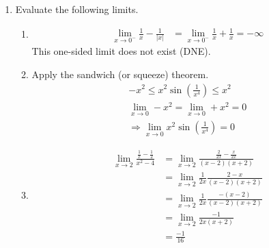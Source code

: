 \begin{enumerate}
    \item Evaluate the following limits.
    \begin{enumerate}
    	\item \begin{align*} 
        \lim_{x \rightarrow 0^-} \frac 1 x - \frac{1}{|x|} 
        &= \lim_{x \rightarrow 0^-} \frac 1 x + \frac{1}{x} = -\infty
        \end{align*}
        This one-sided limit does not exist (DNE). 
    	\item Apply the sandwich (or squeeze) theorem. 
        \begin{align*} 
        	-x^2 \le x^2\sin\left(\frac{1}{x^4}\right) \le x^2\\
        	\lim_{x \rightarrow 0} -x^2 = \lim_{x \rightarrow 0} +x^2 = 0 \\
        	\Rightarrow \lim_{x \rightarrow 0} x^2\sin\left(\frac{1}{x^4}\right) = 0
        \end{align*}
    	\item 
        \begin{align*} 
         	\lim_{x \rightarrow 2} \frac{\frac 1 x - \frac 1 2}{x^2 - 4} 
            & =\lim_{x \rightarrow 2} \frac{\frac {2}{2x} - \frac {x}{2x}}{(x-2)(x+2)} \\
            & =\lim_{x \rightarrow 2} \frac {1}{2x} \frac{2 - x}{(x-2)(x+2)} \\
            & =\lim_{x \rightarrow 2} \frac {1}{2x} \frac{-(x-2)}{(x-2)(x+2)} \\
            & =\lim_{x \rightarrow 2} \frac{-1}{2x(x+2)} \\
            &= \frac{-1}{16}
		\end{align*}
    \end{enumerate}    
    
\end{enumerate}




